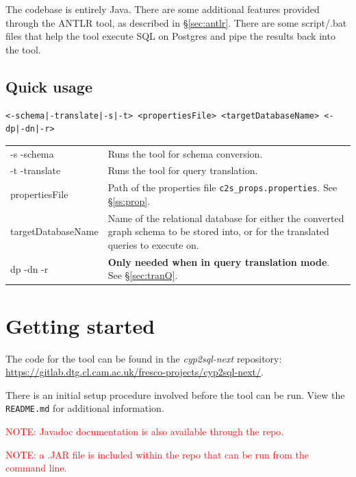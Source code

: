 \documentclass[letterpaper]{ltxdoc}
\begin{document}
\medskip

The codebase is entirely Java. There are some additional features provided through the ANTLR tool, as described in \S \ref{sec:antlr}. There are some script/.bat files that help the tool execute SQL on Postgres and pipe the results back into the tool.

\subsection{Quick usage}
\begin{verbatim}
<-schema|-translate|-s|-t> <propertiesFile> <targetDatabaseName> <-dp|-dn|-r>
\end{verbatim}

\begin{center}
\begin{tabular}{ p{3cm} p{10.5cm} }
-s \textbar{} -schema & Runs the tool for schema conversion. \\
-t \textbar{} -translate & Runs the tool for query translation. \\
propertiesFile & Path of the properties file \texttt{c2s\_props.properties}. See \S \ref{ss:prop}. \\
targetDatabaseName & Name of the relational database for either the converted graph schema to be stored into, or for the translated queries to execute on. \\
dp \textbar{} -dn \textbar{} -r & \textbf{Only needed when in query translation mode}. See \S \ref{sec:tranQ}.
\end{tabular}
\end{center}

\section{Getting started}
The code for the tool can be found in the \emph{cyp2sql-next} repository: \url{https://gitlab.dtg.cl.cam.ac.uk/fresco-projects/cyp2sql-next/}.

\medskip

There is an initial setup procedure involved before the tool can be run. View the \texttt{README.md} for additional information.

\medskip

\textcolor{red}{NOTE: Javadoc documentation is also available through the repo.}

\medskip

\textcolor{red}{NOTE: a .JAR file is included within the repo that can be run from the command line.}
\end{document}
